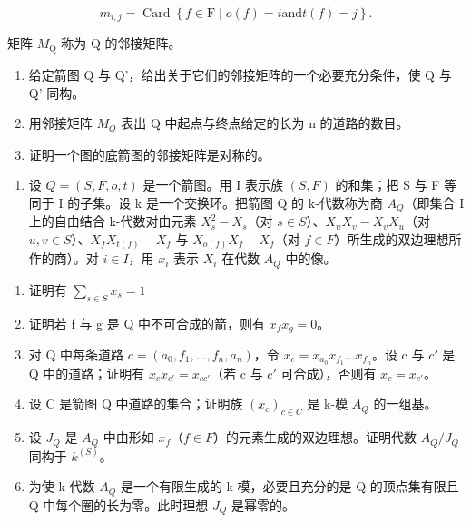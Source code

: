 \[
 m _ {i, j} = \operatorname{Card} \left\{f \in \mathrm{F} \mid o (f) = i \text {and} t (f) = j \right\}.
\]

矩阵 \(M_{\mathrm{Q}}\) 称为 Q 的邻接矩阵。

\begin{enumerate}
\def\labelenumi{\alph{enumi})}
\item
  给定箭图 Q 与 Q'，给出关于它们的邻接矩阵的一个必要充分条件，使 Q 与 Q' 同构。
\item
  用邻接矩阵 \(M_{Q}\) 表出 Q 中起点与终点给定的长为 n 的道路的数目。
\item
  证明一个图的底箭图的邻接矩阵是对称的。
\end{enumerate}

\begin{enumerate}
\def\labelenumi{\arabic{enumi})}
\setcounter{enumi}{3}
\tightlist
\item
  设 \(Q = (S, F, o, t)\) 是一个箭图。用 I 表示族 \((S, F)\) 的和集；把 S 与 F 等同于 I 的子集。设 k 是一个交换环。把箭图 Q 的 k-代数称为商 \(A_{Q}\)（即集合 I 上的自由结合 k-代数对由元素 \(X_{s}^{2} - X_{s}\)（对 \(s \in S\)）、\(X_{u}X_{v} - X_{v}X_{u}\)（对 \(u, v \in S\)）、\(X_{f}X_{t(f)} - X_{f}\) 与 \(X_{o(f)}X_{f} - X_{f}\)（对 \(f \in F\)）所生成的双边理想所作的商）。对 \(i \in I\)，用 \(x_{i}\) 表示 \(X_{i}\) 在代数 \(A_{Q}\) 中的像。
\end{enumerate}

\begin{enumerate}
\def\labelenumi{\alph{enumi})}
\item
  证明有 \(\sum_{s\in S}x_s = 1\)
\item
  证明若 f 与 g 是 Q 中不可合成的箭，则有 \(x_{f}x_{g}=0\)。
\item
  对 Q 中每条道路 \(c = (a_{0}, f_{1}, \ldots, f_{n}, a_{n})\)，令 \(x_{c} = x_{a_{0}} x_{f_{1}} \ldots x_{f_{n}}\)。设 c 与 \(c'\) 是 Q 中的道路；证明有 \(x_{c} x_{c'} = x_{cc'}\)（若 c 与 \(c'\) 可合成），否则有 \(x_{c} = x_{c'}\)。
\item
  设 C 是箭图 Q 中道路的集合；证明族 \((x_{c})_{c\in C}\) 是 k-模 \(A_{Q}\) 的一组基。
\item
  设 \(J_{Q}\) 是 \(A_{Q}\) 中由形如 \(x_{f}\)（\(f \in F\)）的元素生成的双边理想。证明代数 \(A_{Q}/J_{Q}\) 同构于 \(k^{(S)}\)。
\item
  为使 k-代数 \(A_{Q}\) 是一个有限生成的 k-模，必要且充分的是 Q 的顶点集有限且 Q 中每个圈的长为零。此时理想 \(J_{Q}\) 是幂零的。
\end{enumerate}

